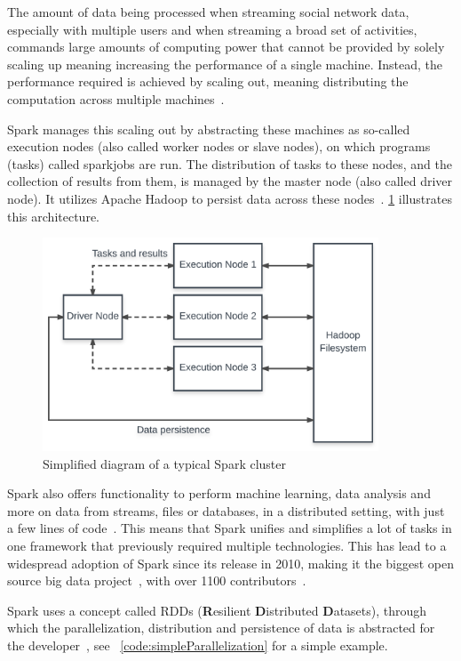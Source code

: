 The amount of data being processed when streaming social network data,
especially with multiple users and when streaming a broad set of activities,
commands large amounts of computing power that cannot be provided by solely scaling up
meaning increasing the performance of a single machine.
Instead, the performance required is achieved by scaling out,
meaning distributing the computation across multiple machines~\cite{Wolke2010}.
\par %
Spark manages this scaling out by abstracting these machines as so-called execution nodes (also called worker nodes or slave nodes),
on which programs (tasks) called sparkjobs are run.
The distribution of tasks to these nodes, and the collection of results from them,
is managed by the master node (also called driver node).
It utilizes Apache Hadoop to persist data across these nodes~\cite{Zaharia2016}.
\ref{fig:spark} illustrates this architecture.

\begin{figure}
    \centering
    \caption{Simplified diagram of a typical Spark cluster}
    \label{fig:spark}
    \includegraphics[width=10cm]{../figures/spark.pdf}
\end{figure}

\par
Spark also offers functionality to perform machine learning, data analysis and more on data from streams,
files or databases, in a distributed setting, with just a few lines of code~\cite{sparkDocs}.
This means that Spark unifies and simplifies a lot of tasks in one framework that previously required multiple technologies.
This has lead to a widespread adoption of Spark since its release in 2010,
making it the biggest open source big data project~\cite{Zaharia2016}, with over 1100 contributors~\cite{sparkContributor}.

\par
Spark uses a concept called RDDs
(\textbf{R}esilient \textbf{D}istributed \textbf{D}atasets),
through which the parallelization, distribution and persistence of data is abstracted for the developer~\cite{sparkDocs}, see ~\ref{code:simpleParallelization} for a simple example.

